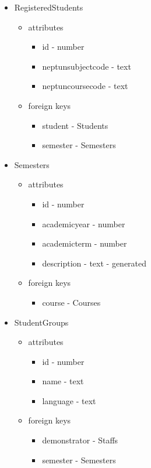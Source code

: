 \begin{itemize}
	\item RegisteredStudents
	\begin{itemize}
		\item attributes
		\begin{itemize}
			\item id - number
			\item neptunsubjectcode - text
			\item neptuncoursecode - text
		\end{itemize}
		\item foreign keys
		\begin{itemize}
			\item student - Students
			\item semester - Semesters
		\end{itemize}
	\end{itemize}
	
	\item Semesters
	\begin{itemize}
		\item attributes
		\begin{itemize}
			\item id - number
			\item academicyear - number
			\item academicterm - number
			\item description - text - generated
		\end{itemize}
		\item foreign keys
		\begin{itemize}
			\item course - Courses
		\end{itemize}
	\end{itemize}
	
	\item StudentGroups
	\begin{itemize}
		\item attributes
		\begin{itemize}
			\item id - number
			\item name - text
			\item language - text
		\end{itemize}
		\item foreign keys
		\begin{itemize}
			\item demonstrator - Staffs
			\item semester - Semesters
		\end{itemize}
	\end{itemize}
	

\end{itemize}
